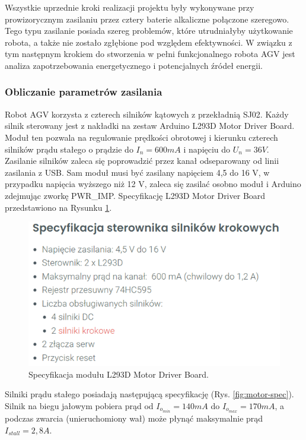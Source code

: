 \documentclass{report}
\begin{document}
Wszystkie uprzednie kroki realizacji projektu były wykonywane przy prowizorycznym zasilaniu przez cztery baterie alkaliczne połączone szeregowo. Tego typu zasilanie posiada szereg problemów, które utrudniałyby użytkowanie robota, a także nie zostało zgłębione pod względem efektywności. W związku z tym następnym krokiem do stworzenia w pełni funkcjonalnego robota AGV jest analiza zapotrzebowania energetycznego i potencjalnych źródeł energii.

\subsubsection{\large Obliczanie parametrów zasilania}

Robot AGV korzysta z czterech silników kątowych z przekładnią SJ02. Każdy silnik sterowany jest z nakładki na zestaw Arduino L293D Motor Driver Board. Moduł ten pozwala na regulowanie prędkości obrotowej i kierunku czterech silników prądu stałego o prądzie do $I_n=600 mA$ i napięciu do $U_n=36 V$. Zasilanie silników zaleca się poprowadzić przez kanał odseparowany od linii zasilania z USB. Sam moduł musi być zasilany napięciem 4,5 do 16 V, w przypadku napięcia wyższego niż 12 V, zaleca się zasilać osobno moduł i Arduino zdejmując zworkę PWR\_IMP. Specyfikację L293D Motor Driver Board przedstawiono na Rysunku \ref{fig:motor-driver-spec}.

\begin{figure}[H]
    \centering
    \includegraphics{src/tech_specifications/L293D Motor Driver Board.png}
    \caption{Specyfikacja modułu L293D Motor Driver Board. \cite{MotorDriver}}
    \label{fig:motor-driver-spec}
\end{figure}

Silniki prądu stałego posiadają następującą specyfikację (Rys. \ref{fig:motor-spec}). Silnik na biegu jałowym 
pobiera prąd od $I_{o_{min}}=140 mA$ do $I_{o_{max}}=170 mA$, a podczas zwarcia (unieruchomiony wał) może płynąć maksymalnie prąd $I_{stall}=2,8 A$.
\end{document}
